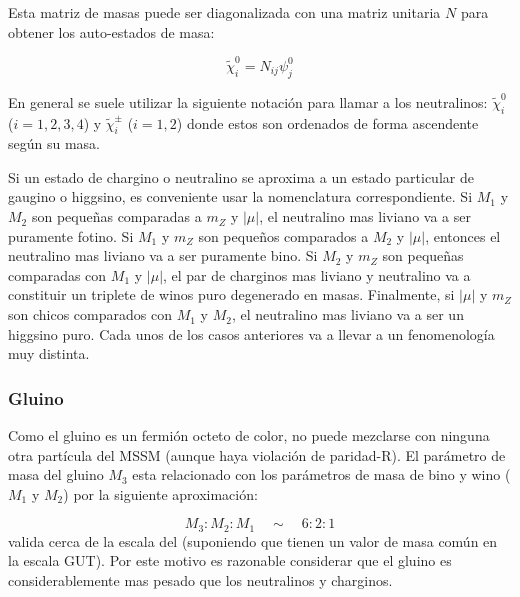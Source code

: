 Esta matriz de masas puede ser diagonalizada con una matriz unitaria $N$ para
obtener los auto-estados de masa:

\begin{equation}
  \tilde{\chi}^0_i = N_{ij} \psi^0_j
\end{equation}

En general se suele utilizar la siguiente notación para llamar a los
neutralinos: $\tilde{\chi}^0_{i}$ ($i=1,2,3,4$) y $\tilde{\chi}^{\pm}_{i}$
($i=1,2$) donde estos son ordenados de forma ascendente según su masa.



Si un estado de chargino o neutralino se aproxima a un estado particular de
gaugino o higgsino, es conveniente usar la nomenclatura correspondiente. Si
$M_1$ y $M_2$ son pequeñas comparadas a $m_Z$ y $|\mu|$, el neutralino mas
liviano va a ser puramente fotino. Si $M_1$ y $m_Z$ son pequeños comparados a
$M_2$ y $|\mu|$, entonces el neutralino mas liviano va a ser puramente bino. Si
$M_2$ y $m_Z$ son pequeñas comparadas con $M_1$ y $|\mu|$, el par de charginos
mas liviano y neutralino va a constituir un triplete de winos puro degenerado en
masas. Finalmente, si $|\mu|$ y $m_Z$ son chicos comparados con $M_1$ y $M_2$,
el neutralino mas liviano va a ser un higgsino puro. Cada unos de los casos
anteriores va a llevar a un fenomenología muy distinta.


\subsubsection{Gluino}

Como el gluino es un fermión octeto de color, no puede mezclarse con ninguna
otra partícula del MSSM (aunque haya violación de paridad-R). El parámetro de
masa del gluino $M_3$ esta relacionado con los parámetros de masa de bino y wino
($M_1$ y $M_2$) por la siguiente aproximación:

\begin{equation}
  M_3 : M_2 : M_1 \quad \sim \quad 6 : 2 : 1
\end{equation}
%
valida cerca de la escala del \tev (suponiendo que tienen un valor de masa común
en la escala GUT). Por este motivo es razonable considerar que el gluino es
considerablemente mas pesado que los neutralinos y charginos.


